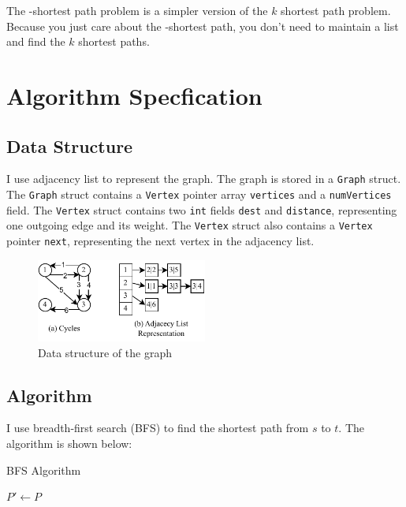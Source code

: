\documentclass[a4paper,oneside]{book}
\begin{document}
The -shortest path problem is a simpler version of the $k$ shortest path problem. Because you just care about the -shortest path, you don't need to maintain a list and find the $k$ shortest paths.

\chapter{Algorithm Specfication}
\label{chap:algorithm}

\section{Data Structure}

I use adjacency list to represent the graph. The graph is stored in a \verb|Graph| struct. The \verb|Graph| struct contains a \verb|Vertex| pointer array \verb|vertices| and a \verb|numVertices| field. The \verb|Vertex| struct contains two \verb|int| fields \verb|dest| and \verb|distance|, representing one outgoing edge and its weight. The \verb|Vertex| struct also contains a \verb|Vertex| pointer \verb|next|, representing the next vertex in the adjacency list.

\begin{figure}[!ht]
    \centering
    \caption{Data structure of the graph}
    \includegraphics[width=0.5\textwidth]{src/ds.drawio.pdf}
\end{figure}

\section{Algorithm}

I use breadth-first search (BFS) to find the shortest path from $s$ to $t$. The algorithm is shown below:

\begin{algorithm}[H]
    \caption{BFS Algorithm}\label{alg:1}
    \DontPrintSemicolon
    \BlankLine
    $P' \gets P$\;
    \;
\end{algorithm}
\end{document}
